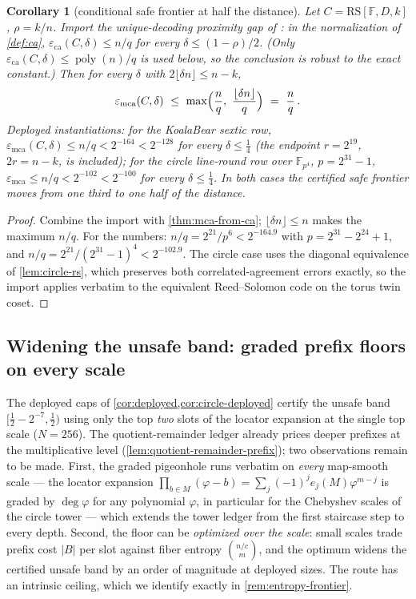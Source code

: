 \documentclass[11pt]{article}
\newtheorem{corollary}[theorem]{Corollary}
\theoremstyle{definition}
\theoremstyle{remark}
\newcommand{\F}{\mathbb{F}}
\newcommand{\B}{B}
\newcommand{\RS}{\mathrm{RS}}
\newcommand{\eca}{\varepsilon_{\mathrm{ca}}}
\newcommand{\emca}{\varepsilon_{\mathrm{mca}}}
\begin{document}
\begin{corollary}[conditional safe frontier at half the distance]\label{cor:conditional-half}
Let $C=\RS[\F,D,k]$, $\rho=k/n$. Import the unique-decoding proximity gap of \cite[Thm.~4.1]{BCIKS20}: in the normalization of \cref{def:ca}, $\eca(C,\delta)\le n/q$ for every $\delta\le(1-\rho)/2$. (Only $\eca(C,\delta)\le\operatorname{poly}(n)/q$ is used below, so the conclusion is robust to the exact constant.) Then for every $\delta$ with $2\lfloor\delta n\rfloor\le n-k$,
\[
\emca(C,\delta)\ \le\ \max\Bigl(\frac nq,\ \frac{\lfloor\delta n\rfloor}q\Bigr)\ =\ \frac nq\,.
\]
Deployed instantiations: for the KoalaBear sextic row, $\emca(C,\delta)\le n/q<2^{-164}<2^{-128}$ for every $\delta\le\tfrac14$ (the endpoint $r=2^{19}$, $2r=n-k$, is included); for the circle line-round row over $\F_{p^4}$, $p=2^{31}-1$, $\emca\le n/q<2^{-102}<2^{-100}$ for every $\delta\le\tfrac14$. In both cases the certified safe frontier moves from one third to one half of the distance.
\end{corollary}

\begin{proof}
Combine the import with \cref{thm:mca-from-ca}; $\lfloor\delta n\rfloor\le n$ makes the maximum $n/q$. For the numbers: $n/q=2^{21}/p^6<2^{-164.9}$ with $p=2^{31}-2^{24}+1$, and $n/q=2^{21}/(2^{31}-1)^4<2^{-102.9}$. The circle case uses the diagonal equivalence of \cref{lem:circle-rs}, which preserves both correlated-agreement errors exactly, so the import applies verbatim to the equivalent Reed--Solomon code on the torus twin coset.
\end{proof}

\subsection{Widening the unsafe band: graded prefix floors on every scale}\label{sec:pincer-floors}

The deployed caps of \cref{cor:deployed,cor:circle-deployed} certify the unsafe band $[\tfrac12-2^{-7},\tfrac12)$ using only the top \emph{two} slots of the locator expansion at the single top scale ($N=256$). The quotient-remainder ledger already prices deeper prefixes at the multiplicative level (\cref{lem:quotient-remainder-prefix}); two observations remain to be made. First, the graded pigeonhole runs verbatim on \emph{every} map-smooth scale --- the locator expansion $\prod_{b\in M}(\varphi-b)=\sum_j(-1)^je_j(M)\varphi^{m-j}$ is graded by $\deg\varphi$ for any polynomial $\varphi$, in particular for the Chebyshev scales of the circle tower --- which extends the tower ledger from the first staircase step to every depth. Second, the floor can be \emph{optimized over the scale}: small scales trade prefix cost $|\B|$ per slot against fiber entropy $\binom{n/c}{m}$, and the optimum widens the certified unsafe band by an order of magnitude at deployed sizes. The route has an intrinsic ceiling, which we identify exactly in \cref{rem:entropy-frontier}.
\end{document}
